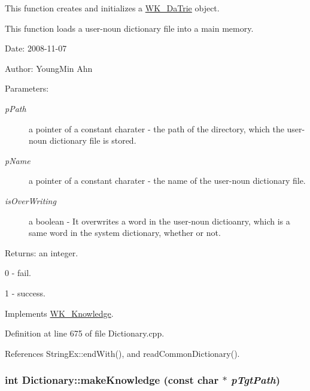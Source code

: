 This function creates and initializes a \hyperlink{classkmaOrange_1_1WK__DaTrie}{WK\_\-DaTrie} object.\par
 This function loads a user-noun dictionary file into a main memory. 

\begin{Desc}
\item[Date:]2008-11-07 \end{Desc}
\begin{Desc}
\item[Author:]YoungMin Ahn \end{Desc}
\begin{Desc}
\item[Parameters:]
\begin{description}
\item[{\em pPath}]a pointer of a constant charater - the path of the directory, which the user-noun dictionary file is stored. \item[{\em pName}]a pointer of a constant charater - the name of the user-noun dictionary file. \item[{\em isOverWriting}]a boolean - It overwrites a word in the user-noun dictioanry, which is a same word in the system dictionary, whether or not. \end{description}
\end{Desc}
\begin{Desc}
\item[Returns:]an integer.\par
 0 - fail.\par
 1 - success. \end{Desc}


Implements \hyperlink{classWK__Knowledge_08574e4818e76b18fb58c4b4eec1d6aa}{WK\_\-Knowledge}.

Definition at line 675 of file Dictionary.cpp.

References StringEx::endWith(), and readCommonDictionary().\hypertarget{classkmaOrange_1_1Dictionary_50781e76950dced011623aaeb4d81500}{
\subsubsection[{makeKnowledge}]{\setlength{\rightskip}{0pt plus 5cm}int Dictionary::makeKnowledge (const char $\ast$ {\em pTgtPath})}}
\label{classkmaOrange_1_1Dictionary_50781e76950dced011623aaeb4d81500}


